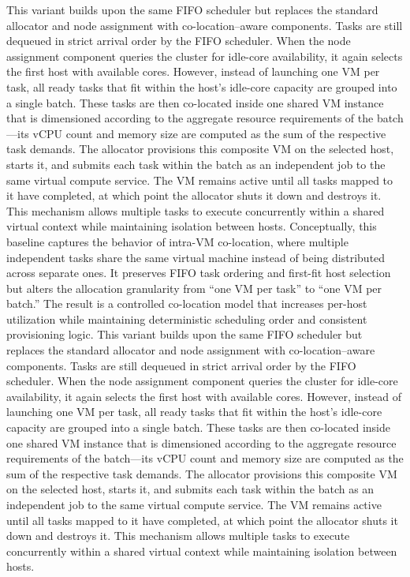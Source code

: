 This variant builds upon the same FIFO scheduler but replaces the standard allocator and node assignment with co-location–aware components. Tasks are still dequeued in strict arrival order by the FIFO scheduler. When the node assignment component queries the cluster for idle-core availability, it again selects the first host with available cores. However, instead of launching one VM per task, all ready tasks that fit within the host’s idle-core capacity are grouped into a single batch. These tasks are then co-located inside one shared VM instance that is dimensioned according to the aggregate resource requirements of the batch—its vCPU count and memory size are computed as the sum of the respective task demands.
The allocator provisions this composite VM on the selected host, starts it, and submits each task within the batch as an independent job to the same virtual compute service. The VM remains active until all tasks mapped to it have completed, at which point the allocator shuts it down and destroys it. This mechanism allows multiple tasks to execute concurrently within a shared virtual context while maintaining isolation between hosts.
Conceptually, this baseline captures the behavior of intra-VM co-location, where multiple independent tasks share the same virtual machine instead of being distributed across separate ones. It preserves FIFO task ordering and first-fit host selection but alters the allocation granularity from “one VM per task” to “one VM per batch.” The result is a controlled co-location model that increases per-host utilization while maintaining deterministic scheduling order and consistent provisioning logic.
This variant builds upon the same FIFO scheduler but replaces the standard allocator and node assignment with co-location–aware components. Tasks are still dequeued in strict arrival order by the FIFO scheduler. When the node assignment component queries the cluster for idle-core availability, it again selects the first host with available cores. However, instead of launching one VM per task, all ready tasks that fit within the host’s idle-core capacity are grouped into a single batch. These tasks are then co-located inside one shared VM instance that is dimensioned according to the aggregate resource requirements of the batch—its vCPU count and memory size are computed as the sum of the respective task demands.
The allocator provisions this composite VM on the selected host, starts it, and submits each task within the batch as an independent job to the same virtual compute service. The VM remains active until all tasks mapped to it have completed, at which point the allocator shuts it down and destroys it. This mechanism allows multiple tasks to execute concurrently within a shared virtual context while maintaining isolation between hosts.
